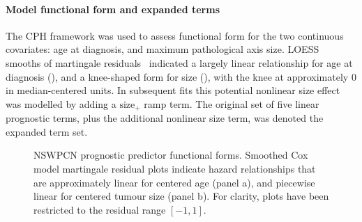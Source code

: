 \documentclass[dissertation.tex]{subfiles}
\begin{document}
\paragraph{Model functional form and expanded terms}
The \gls{CPH} framework was used to assess functional form for the two continuous covariates: age at diagnosis, and maximum pathological axis size.  \Gls{LOESS} smooths of martingale residuals~\cite{Therneau1990} indicated a largely linear relationship for age at diagnosis (), and a knee-shaped form for size (), with the knee at approximately $0$ in median-centered units.  In subsequent fits this potential nonlinear size effect was modelled by adding a $\mathrm{size}_+$ ramp term.  The original set of five linear prognostic terms, plus the additional nonlinear size term, was denoted the expanded term set.

\begin{figure}
\centering
\caption[Prognostic predictor functional forms]{\gls{NSWPCN} prognostic predictor functional forms. Smoothed Cox model martingale residual plots indicate hazard relationships that are approximately linear for centered age (panel a), and piecewise linear for centered tumour size (panel b).  For clarity, plots have been restricted to the residual range $[-1,1]$.}
\label{fig:nomo-funcform}
\end{figure}
\end{document}
